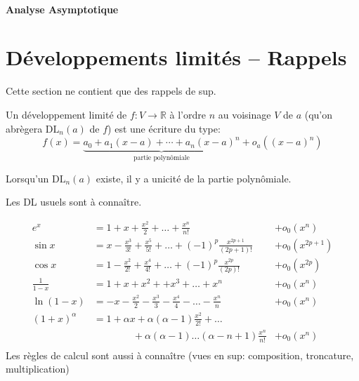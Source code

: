 \ifsolo
    ~

    \vspace{1cm}

    \begin{center}
        \textbf{\LARGE Analyse Asymptotique} \\[1em]
    \end{center}
    \tableofcontents
\else
    \minitoc
\fi
\thispagestyle{empty}

\ifsolo \newpage \setcounter{page}{1} \fi
\section{Développements limités -- Rappels}

Cette section ne contient que des rappels de sup.

\begin{dfn}
    Un développement limité de $f:V\longrightarrow \mathbb R$ à l'ordre $n$ au voisinage $V$ de $a$ (qu'on abrègera $\mathrm{DL}_n(a)$ de $f$) est une écriture du type: \[
        f(x)=\underbrace{a_0+a_1(x-a)+\cdots +a_n(x-a)^n}_{\text{partie polynômiale}}+o_a((x-a)^n)
    \]
\end{dfn}

\begin{rem}
    Lorsqu'un $\mathrm{DL}_n(a)$ existe, il y a unicité de la partie polynômiale.
\end{rem}

\begin{rem}
    Les DL usuels sont à connaître.

\begin{align*}
    e^x &= 1 + x + \frac{x^2}{2} +\ldots+ \frac{x^n}{n!} &+ o_0(x^n) \\
    \sin x &= x - \frac{x^3}{3!}+\frac{x^5}{5!} +\ldots+(-1)^p\frac{x^{2p+1}}{(2p+1)!}
           & +o_0(x^{2p+1} ) \\
    \cos x &= 1 - \frac{x^2}{2!}+\frac{x^4}{4!} +\ldots+(-1)^p\frac{x^{2p}}{(2p)!}
           & +o_0(x^{2p}) \\
    \frac{1}{1-x} &= 1 + x + x^2 + + x^3 + \ldots + x^n
        & + o_0(x^n) \\
    \ln (1-x) &= -x - \frac{x^2}{2} - \frac{x^3}{3} - \frac{x^4}{4} - \ldots - \frac{x^n}{n}
        & + o_0(x^n) \\
    (1+x)^\alpha &= 1 + \alpha x + \alpha (\alpha-1) \frac{x^2}{2!} + \ldots \\ 
        & \qquad\qquad +\alpha(\alpha-1)\ldots(\alpha-n+1)\frac{x^n}{n!}
        & + o_0(x^n) \\
\end{align*}
Les règles de calcul sont aussi à connaître (vues en sup: composition, troncature, multiplication)
\end{rem}

